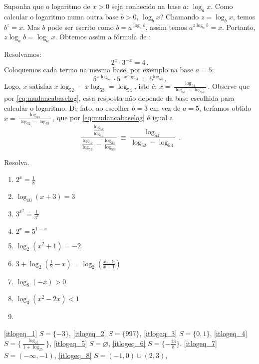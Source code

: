 Suponha que o logaritmo de $x>0$ seja conhecido na base $a$: $\log_a x$. Como
calcular o logaritmo numa outra base $b>0$, $\log_bx$? Chamando $z=\log_bx$,
temos $b^z=x$. Mas $b$ pode ser escrito como $b=a^{\log_ab}$, assim temos
$a^{z\log_ab}=x$. Portanto, $z\log_ab=\log_ax$. Obtemos assim a fórmula de
:

\begin{ex}
Resolvamos: 
$$2^x\cdot 3^{-x}=4\,.$$
Coloquemos cada termo na mesma base, por exemplo na base $a=5$:
$$5^{x\log_52}\cdot 5^{-x\log_53}=5^{\log_54}\,.$$
Logo, $x$ satisfaz $x\log_52-x\log_53=\log_54$, isto é:
$x=\frac{\log_54}{\log_52-\log_53}$.
Observe que por \eqref{eq:mudancabaselog}, essa resposta não depende da base
escolhida para calcular o logaritmo. 
De fato, ao escolher $b=3$ em vez de $a=5$,
teríamos obtido $x=\frac{\log_34}{\log_32-\log_33}$, que por
\eqref{eq:mudancabaselog} é igual a
$$\frac{\frac{\log_54}{\log_53}}{\frac{\log_52}{\log_53}-\frac{\log_33}{\log_53}
}
\equiv \frac{\log_54}{\log_52-\log_53}\,.
$$
\end{ex}

\begin{exo}
Resolva.
\begin{multicols}{3}
\begin{enumerate}
\item\label{itlogeq_1} $2^x=\frac18$
\item \label{itlogeq_2}$\log_{10}(x+3)=3$
\item\label{itlogeq_3} $3^{x^2}=\frac{1}{3^x}$
\item\label{itlogeq_4} $2^x=5^{1-x}$
\item\label{itlogeq_5} $\log_2(x^2+1)=-2$
\item\label{itlogeq_6} $3+\log_2(\tfrac12-x)=\log_2(\tfrac{x-9}{x+1})$
\item\label{itlogeq_7} $\log_8(-x)>0$
\item\label{itlogeq_8} $\log_3(x^2-2x)<1$
\item\label{itlogeq_9} 
\end{enumerate}
\end{multicols}
\vspace{0.1mm}
\begin{sol}
\eqref{itlogeq_1} $S=\{-3\}$,
\eqref{itlogeq_2} $S=\{997\}$,
\eqref{itlogeq_3} $S=\{0,1\}$,
\eqref{itlogeq_4} $S=\{\frac{\log_25}{1+\log_25}\}$,
\eqref{itlogeq_5} $S=\varnothing$,
\eqref{itlogeq_6} $S=\{-\tfrac{13}{8}\}$.
\eqref{itlogeq_7} $S=(-\infty,-1)$,
\eqref{itlogeq_8} $S=(-1,0)\cup(2,3)$,
\end{sol}
\end{exo}

